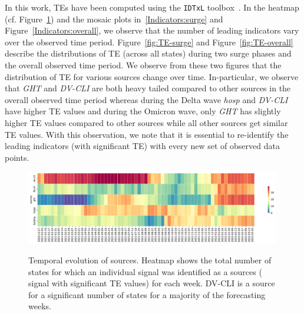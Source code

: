 \documentclass[conference,compsoc]{IEEEtran}
\begin{document}
In this work, TEs have been computed using the \verb|IDTxL| toolbox~\cite{wollstadt2018idtxl}. In the heatmap (cf. Figure~\ref{fig:averall_heatmap}) and the mosaic plots in~\ref{Indicators:surge} and Figure~\ref{Indicators:overall}, we observe that the number of leading indicators vary over the observed time period.
Figure~\ref{fig:TE-surge} and Figure~\ref{fig:TE-overall} describe the   distributions of TE (across all states)  during two surge phases and the overall observed time period. We observe from these two figures that the distribution of TE for various sources change over time. In-particular, we observe that \emph{GHT} and \emph{DV-CLI} are both heavy tailed compared to other sources in the overall observed time period whereas during the Delta wave \emph{hosp} and \emph{DV-CLI} have higher TE values and during the Omicron wave, only \emph{GHT} has slightly higher TE values compared to other sources while all other sources get similar TE values. With this observation, we note that it is essential to re-identify the leading indicators (with significant TE) with every new set of observed data points. 
\begin{figure}[!t]
    \centering
    \includegraphics[width=0.99\textwidth]{figs/cases_htmap_te_srcs_len_each_week.pdf}
     \label{fig:TE-surge}
     \caption{Temporal evolution of sources. Heatmap shows the total number of states for which an individual signal was identified as a sources ( signal with significant TE values) for each week. DV-CLI is a source for a significant number of states for a majority of the forecasting weeks.}
     \label{fig:averall_heatmap}
\end{figure}
\end{document}
